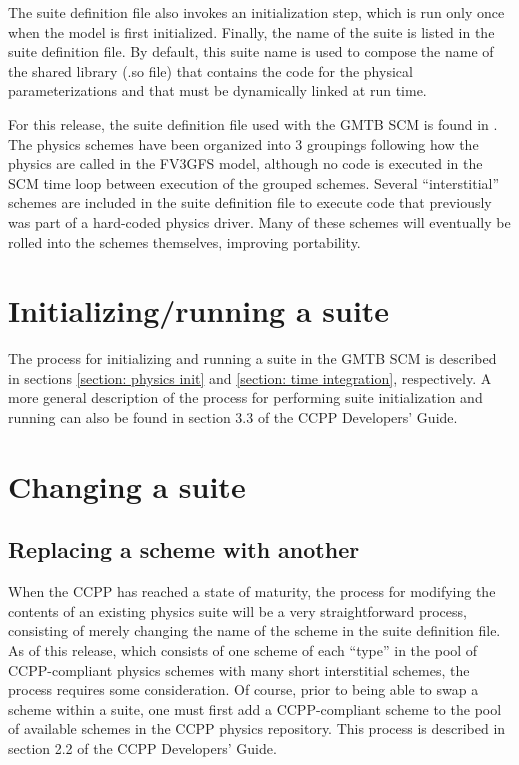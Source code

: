 The suite definition file also invokes an initialization step, which is run only once when the model is first initialized. Finally, the name of the suite is listed in the suite definition file. By default, this suite name is used to compose the name of the shared library (.so file) that contains the code for the physical parameterizations and that must be dynamically linked at run time.

For this release, the suite definition file used with the GMTB SCM is found in . The physics schemes have been organized into 3 groupings following how the physics are called in the FV3GFS model, although no code is executed in the SCM time loop between execution of the grouped schemes. Several ``interstitial'' schemes are included in the suite definition file to execute code that previously was part of a hard-coded physics driver. Many of these schemes will eventually be rolled into the schemes themselves, improving portability.

\section{Initializing/running a suite}
The process for initializing and running a suite in the GMTB SCM is described in sections \ref{section: physics init} and \ref{section: time integration}, respectively. A more general description of the process for performing suite initialization and running can also be found in section 3.3 of the CCPP Developers' Guide.

\section{Changing a suite}

\subsection{Replacing a scheme with another}

When the CCPP has reached a state of maturity, the process for modifying the contents of an existing physics suite will be a very straightforward process, consisting of merely changing the name of the scheme in the suite definition file. As of this release, which consists of one scheme of each ``type'' in the pool of CCPP-compliant physics schemes with many short interstitial schemes, the process requires some consideration. Of course, prior to being able to swap a scheme within a suite, one must first add a CCPP-compliant scheme to the pool of available schemes in the CCPP physics repository. This process is described in section 2.2 of the CCPP Developers' Guide.

